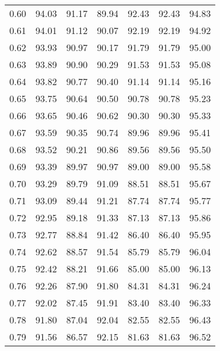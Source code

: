\begin{tabular}{|c|c|c|c|c|c|c|}
      0.60 &     94.03 &     91.17 &      89.94 &   92.43 &      92.43 &         94.83 \\
      0.61 &     94.01 &     91.12 &      90.07 &   92.19 &      92.19 &         94.92 \\
      0.62 &     93.93 &     90.97 &      90.17 &   91.79 &      91.79 &         95.00 \\
      0.63 &     93.89 &     90.90 &      90.29 &   91.53 &      91.53 &         95.08 \\
      0.64 &     93.82 &     90.77 &      90.40 &   91.14 &      91.14 &         95.16 \\
      0.65 &     93.75 &     90.64 &      90.50 &   90.78 &      90.78 &         95.23 \\
      0.66 &     93.65 &     90.46 &      90.62 &   90.30 &      90.30 &         95.33 \\
      0.67 &     93.59 &     90.35 &      90.74 &   89.96 &      89.96 &         95.41 \\
      0.68 &     93.52 &     90.21 &      90.86 &   89.56 &      89.56 &         95.50 \\
      0.69 &     93.39 &     89.97 &      90.97 &   89.00 &      89.00 &         95.58 \\
      0.70 &     93.29 &     89.79 &      91.09 &   88.51 &      88.51 &         95.67 \\
      0.71 &     93.09 &     89.44 &      91.21 &   87.74 &      87.74 &         95.77 \\
      0.72 &     92.95 &     89.18 &      91.33 &   87.13 &      87.13 &         95.86 \\
      0.73 &     92.77 &     88.84 &      91.42 &   86.40 &      86.40 &         95.95 \\
      0.74 &     92.62 &     88.57 &      91.54 &   85.79 &      85.79 &         96.04 \\
      0.75 &     92.42 &     88.21 &      91.66 &   85.00 &      85.00 &         96.13 \\
      0.76 &     92.26 &     87.90 &      91.80 &   84.31 &      84.31 &         96.24 \\
      0.77 &     92.02 &     87.45 &      91.91 &   83.40 &      83.40 &         96.33 \\
      0.78 &     91.80 &     87.04 &      92.04 &   82.55 &      82.55 &         96.43 \\
      0.79 &     91.56 &     86.57 &      92.15 &   81.63 &      81.63 &         96.52 \\

\end{tabular}
